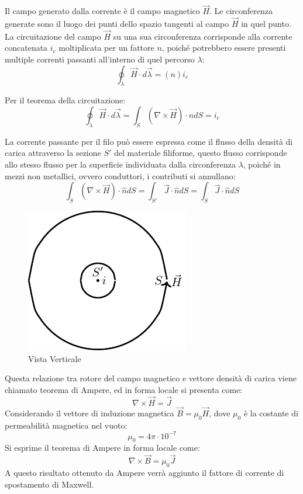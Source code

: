 \documentclass{article}
\numberwithin{equation}{subsection}
\begin{document}
Il campo generato dalla corrente è il campo magnetico $\vec{H}$. Le circonferenza generate sono il luogo dei punti dello spazio tangenti al campo $\vec{H}$ 
in quel punto. La circuitazione del campo $\vec{H}$ su una sua circonferenza corrisponde alla corrente concatenata $i_c$ moltiplicata per un fattore $n$, poiché potrebbero essere presenti multiple 
correnti passanti all'interno di quel percorso $\lambda$: 
\begin{equation*}
    \displaystyle\oint_{\lambda}\vec{H}\cdot d\vec{\lambda}=(n)i_c
\end{equation*}

Per il teorema della circuitazione:
\begin{equation*}
    \displaystyle\oint_{\lambda}\vec{H}\cdot d\vec{\lambda}=\int_S(\nabla\times\vec{H})\cdot\hat{n}dS=i_c
\end{equation*}

La corrente passante per il filo può essere espressa come il flusso della densità di carica attraverso la sezione $S'$ del materiale filiforme, questo flusso corrisponde allo 
stesso flusso per la superficie individuata dalla circonferenza $\lambda$, poiché in mezzi non metallici, ovvero conduttori, i contributi si annullano:
\begin{equation}
    \displaystyle\int_S(\nabla\times\vec{H})\cdot\hat{n}dS=\int_{S'}\vec{J}\cdot\hat{n}dS=\int_S\vec{J}\cdot\hat{n}dS
\end{equation}

\begin{figure}[H]%
    \centering
    \includegraphics{corrente-campo-magnetico.pdf}
    \caption{Vista Verticale}
    \label{fig:corrente-campo-magnetico}
\end{figure}

Questa relazione tra rotore del campo magnetico e vettore densità di carica viene chiamato teorema di Ampere, ed in forma locale si presenta come:
\begin{equation*}
    \nabla\times\vec{H}=\vec{J}
\end{equation*}
Considerando il vettore di induzione magnetica $\vec{B}=\mu_0\vec{H}$, dove $\mu_0$ è la costante di permeabilità magnetica nel vuoto:
\begin{equation*}
    \mu_0=4\pi\cdot10^{-7}
\end{equation*}
Si esprime il teorema di Ampere in forma locale come:
\begin{equation}
    \nabla\times\vec{B}=\mu_0\vec{J}
\end{equation}
A questo risultato ottenuto da Ampere verrà aggiunto il fattore di corrente di spostamento di Maxwell. 
\end{document}
